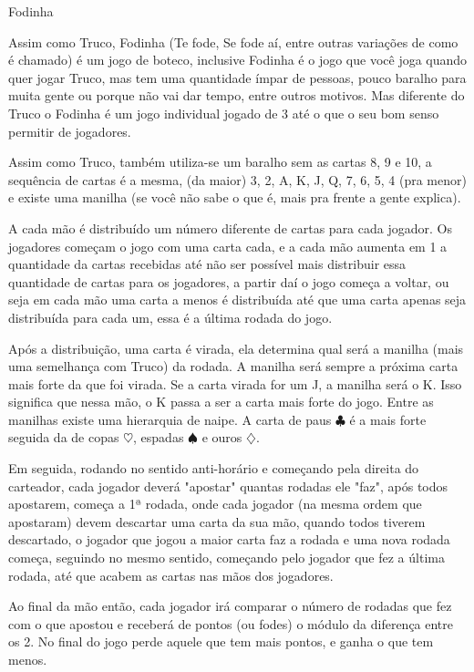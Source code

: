 \begin{subsecao}{Fodinha}

Assim como Truco, Fodinha (Te fode, Se fode aí, entre outras variações de como é chamado) é um jogo de boteco, inclusive Fodinha é o jogo
que você joga quando quer jogar Truco, mas tem uma quantidade ímpar de 
pessoas, pouco baralho para muita gente ou porque não vai dar tempo, entre outros motivos. Mas
diferente do Truco o Fodinha é um jogo individual jogado de 3 até o que o seu bom senso permitir de jogadores.

Assim como Truco, também utiliza-se um baralho sem as cartas 8, 9 e 10, a sequência
de cartas é a mesma, (da maior) 3, 2, A, K, J, Q, 7, 6, 5, 4 (pra menor)
e existe uma manilha (se você não sabe o que é, mais pra frente a gente explica).

A cada mão é distribuído um número diferente de cartas para cada jogador. Os
jogadores começam o jogo com uma carta cada, e a cada mão aumenta em 1 a
quantidade da cartas recebidas até não ser possível mais distribuir essa quantidade de cartas para os jogadores, a partir daí 
o jogo começa a voltar, ou seja em cada mão uma carta a menos é distribuída até que uma carta apenas seja distribuída para 
cada um, essa é a última rodada do jogo. 

Após a distribuição, uma carta é virada, ela determina qual será a 
manilha (mais uma semelhança com Truco) da rodada. A manilha será sempre a próxima carta mais forte da que foi virada.
Se a carta virada for um J, a manilha será o K. Isso significa que nessa mão, o
K passa a ser a carta mais forte do jogo. Entre as manilhas existe uma
hierarquia de naipe. A carta de paus $\clubsuit$  é a mais forte seguida da de copas $\heartsuit$,
espadas $\spadesuit$ e ouros $\diamondsuit$.

Em seguida, rodando no sentido anti-horário e começando pela direita do carteador, cada jogador deverá "apostar" 
quantas rodadas ele "faz", após todos apostarem, começa a 1ª rodada, onde cada jogador (na mesma ordem que apostaram) 
devem descartar uma carta da sua mão, quando todos tiverem descartado, o jogador que jogou a maior carta faz a rodada 
e uma nova rodada começa, seguindo no mesmo sentido, começando pelo jogador que fez a última rodada, até que acabem
as cartas nas mãos dos jogadores.

Ao final da mão então, cada jogador irá comparar o número de rodadas que fez com o que apostou e receberá de pontos (ou fodes) 
o módulo da diferença entre os 2. No final do jogo perde aquele que tem mais pontos, e ganha o que tem menos.


\end{subsecao}
